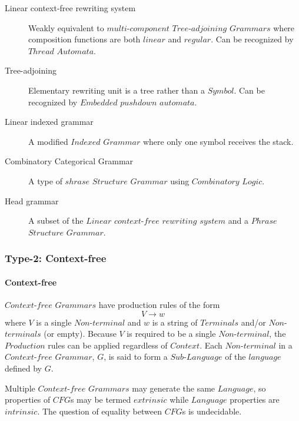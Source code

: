 \documentclass{article}
\begin{document}
\begin{description}
\item[Linear context-free rewriting system]

    Weakly equivalent to $multi$-$component$ $Tree$-$adjoining$
    $Grammars$ where composition functions are both $linear$ and
    $regular$. Can be recognized by $Thread$ $Automata$.

\item[Tree-adjoining]

    Elementary rewriting unit is a tree rather than a $Symbol$. Can be
    recognized by $Embedded$ $pushdown$ $automata$.

\item[Linear indexed grammar]

    A modified $Indexed$ $Grammar$ where only one symbol receives the
    stack.

\item[Combinatory Categorical Grammar]

    A type of $shrase$ $Structure$ $Grammar$ using $Combinatory$
    $Logic$.

\item[Head grammar]

    A subset of the $Linear$ $context$-$free$ $rewriting$ $system$ and
    a $Phrase$ $Structure$ $Grammar$.

\end{description}

\subsubsection{Type-2: Context-free}

\paragraph{Context-free}
$Context$-$free$ $Grammars$ have production rules of the form
\[
    V \rightarrow w
\]
where $V$ is a single $Non$-$terminal$ and $w$ is a string of
$Terminals$ and/or $Non$-$terminals$ (or empty). Because $V$ is
required to be a single $Non$-$terminal$, the $Production$ rules can
be applied regardless of $Context$. Each $Non$-$terminal$ in a
$Context$-$free$ $Grammar$, $G$, is said to form a $Sub$-$Language$ of
the $language$ defined by $G$.

Multiple $Context$-$free$ $Grammars$ may generate the same $Language$,
so properties of $CFG$s may be termed $extrinsic$ while $Language$
properties are $intrinsic$. The question of equality between $CFG$s is
undecidable.
\end{document}
